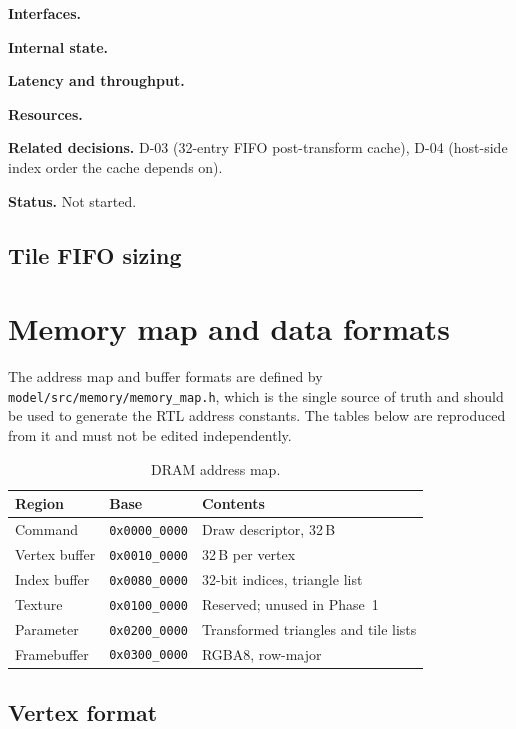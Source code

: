 \documentclass[11pt,a4paper]{article}
\newcommand{\field}[1]{\textbf{#1}\quad}
\begin{document}
\field{Interfaces.} %

\field{Internal state.} %

\field{Latency and throughput.} %

\field{Resources.} %

\field{Related decisions.} D-03 (32-entry FIFO post-transform cache),
D-04 (host-side index order the cache depends on).

\field{Status.} Not started.

\subsection{Tile FIFO sizing}

\section{Memory map and data formats}
\label{sec:memmap}

The address map and buffer formats are defined by
\texttt{model/src/memory/memory\_map.h}, which is the single source of truth
and should be used to generate the RTL address constants. The tables below are
reproduced from it and must not be edited independently.

\begin{table}[ht]
\centering
\begin{tabular}{@{}lll@{}}
\toprule
\textbf{Region} & \textbf{Base} & \textbf{Contents} \\
\midrule
Command       & \texttt{0x0000\_0000} & Draw descriptor, 32\,B \\
Vertex buffer & \texttt{0x0010\_0000} & 32\,B per vertex \\
Index buffer  & \texttt{0x0080\_0000} & 32-bit indices, triangle list \\
Texture       & \texttt{0x0100\_0000} & Reserved; unused in Phase~1 \\
Parameter     & \texttt{0x0200\_0000} & Transformed triangles and tile lists \\
Framebuffer   & \texttt{0x0300\_0000} & RGBA8, row-major \\
\bottomrule
\end{tabular}
\caption{DRAM address map.}
\label{tab:memmap}
\end{table}

\subsection{Vertex format}
\end{document}
